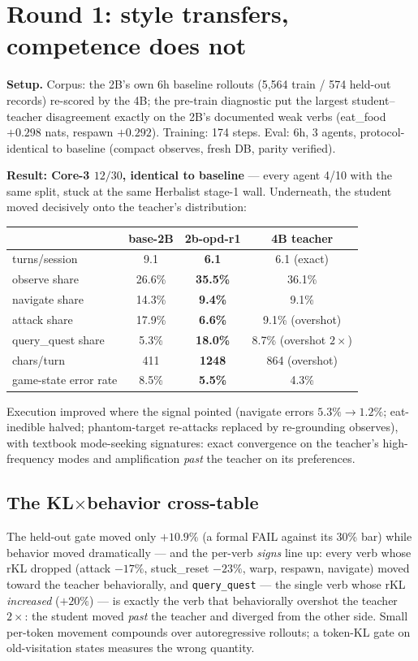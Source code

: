 \documentclass[11pt]{article}
\begin{document}
\section{Round 1: style transfers, competence does not}

\textbf{Setup.} Corpus: the 2B's own 6h baseline rollouts (5{,}564 train / 574 held-out records)
re-scored by the 4B; the pre-train diagnostic put the largest student--teacher disagreement
exactly on the 2B's documented weak verbs (eat\_food $+0.298$ nats, respawn $+0.292$).
Training: 174 steps. Eval: 6h, 3 agents, protocol-identical to baseline (compact observes,
fresh DB, parity verified).

\textbf{Result: Core-3 $12/30$, identical to baseline} --- every agent 4/10 with the same split,
stuck at the same Herbalist stage-1 wall. Underneath, the student moved decisively onto the
teacher's distribution:

\begin{center}
\begin{tabular}{lccc}
\toprule
 & base-2B & 2b-opd-r1 & 4B teacher \\
\midrule
turns/session & 9.1 & \textbf{6.1} & 6.1 (exact) \\
observe share & 26.6\% & \textbf{35.5\%} & 36.1\% \\
navigate share & 14.3\% & \textbf{9.4\%} & 9.1\% \\
attack share & 17.9\% & \textbf{6.6\%} & 9.1\% (overshot) \\
query\_quest share & 5.3\% & \textbf{18.0\%} & 8.7\% (overshot $2\times$) \\
chars/turn & 411 & \textbf{1248} & 864 (overshot) \\
game-state error rate & 8.5\% & \textbf{5.5\%} & 4.3\% \\
\bottomrule
\end{tabular}
\end{center}

Execution improved where the signal pointed (navigate errors $5.3\%\!\rightarrow\!1.2\%$;
eat-inedible halved; phantom-target re-attacks replaced by re-grounding observes), with textbook
mode-seeking signatures: exact convergence on the teacher's high-frequency modes and
amplification \emph{past} the teacher on its preferences.

\subsection{The \texorpdfstring{KL$\times$behavior}{KL-times-behavior} cross-table}
\label{sec:crosstable}
The held-out gate moved only $+10.9\%$ (a formal FAIL against its 30\% bar) while behavior moved
dramatically --- and the per-verb \emph{signs} line up: every verb whose rKL dropped (attack
$-17\%$, stuck\_reset $-23\%$, warp, respawn, navigate) moved toward the teacher behaviorally,
and \texttt{query\_quest} --- the single verb whose rKL \emph{increased} ($+20\%$) --- is exactly
the verb that behaviorally overshot the teacher $2\times$: the student moved \emph{past} the
teacher and diverged from the other side. Small per-token movement compounds over autoregressive
rollouts; a token-KL gate on old-visitation states measures the wrong quantity.
\end{document}
